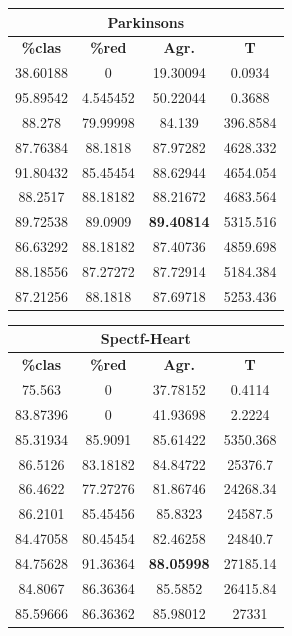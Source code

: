 \documentclass[11pt,a4paper]{article}
\theoremstyle{definition}
\begin{document}
\begin{tabbing}
{		\begin{tabular}{|c|c|c|c|}
			\hline
			\multicolumn{4}{|c|}{\textbf{Parkinsons}} \\ \hline
			\textbf{\%clas} & \textbf{\%red} & \textbf{Agr.} & \textbf{T} \\ \hline 
			38.60188	&0	        &19.30094	&0.0934\\ \hline
95.89542&	4.545452	&50.22044	&0.3688\\ \hline
88.278	 & 79.99998	&84.139	  &396.8584\\ \hline
87.76384 & 88.1818 & 87.97282 & 4628.332\\ \hline
91.80432 & 85.45454 & 88.62944 & 4654.054\\ \hline
88.2517 & 88.18182 & 88.21672 & 4683.564\\ \hline
89.72538 & 89.0909 & \textbf{89.40814} & 5315.516\\ \hline
86.63292 & 88.18182 & 87.40736 & 4859.698\\ \hline
88.18556 & 87.27272 & 87.72914 & 5184.384\\ \hline
87.21256 & 88.1818 & 87.69718 & 5253.436\\ \hline

		\end{tabular}
		
		\begin{tabular}{|c|c|c|c|}
			\hline
			\multicolumn{4}{|c|}{\textbf{Spectf-Heart}} \\ \hline
			\textbf{\%clas} & \textbf{\%red} & \textbf{Agr.} & \textbf{T} \\ \hline 
			75.563	  &0	      &37.78152	&0.4114\\ \hline
83.87396	&0	      &41.93698	&2.2224\\ \hline
85.31934	&85.9091	&85.61422	&5350.368\\ \hline
86.5126 & 83.18182 & 84.84722 & 25376.7\\ \hline
86.4622 & 77.27276 & 81.86746 & 24268.34\\ \hline
86.2101 & 85.45456 & 85.8323 & 24587.5\\ \hline
84.47058 & 80.45454 & 82.46258 & 24840.7\\ \hline
84.75628 & 91.36364 & \textbf{88.05998} & 27185.14\\ \hline
84.8067 & 86.36364 & 85.5852 & 26415.84\\ \hline
85.59666 & 86.36362 & 85.98012 & 27331\\ \hline
		\end{tabular}
		}
	\end{tabbing}~\\
	
\end{document}

